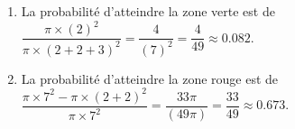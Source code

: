 \begin{corrige}
    \begin{enumerate}
        \item La probabilité d'atteindre la zone verte est de $\dfrac{\pi\times (2)^2}{\pi\times (2 + 2 + 3)^2} = \dfrac{4}{(7)^2} = \dfrac{4}{49} \approx \num{0,082}$.
        \item La probabilité d'atteindre la zone rouge est de $\dfrac{\pi\times 7^2 - \pi\times (2 + 2)^2}{\pi\times 7^2} = \dfrac{33\pi}{(49\pi)} = \dfrac{33}{49} \approx \num{0,673}$.
    \end{enumerate}
\end{corrige}

